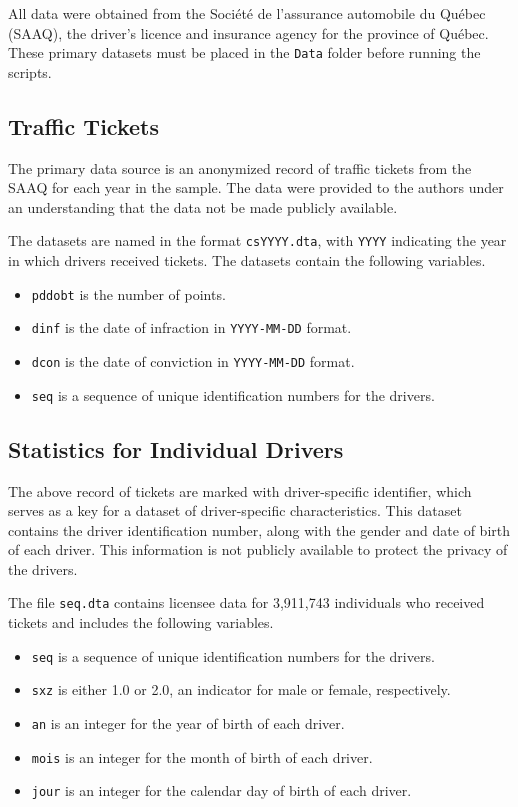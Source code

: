 \documentclass[11pt]{paper}
\begin{document}
All data were obtained from the 
Société de l'assurance automobile du Qu\'{e}bec (SAAQ), 
the driver's licence and insurance agency 
for the province of Qu\'{e}bec. 
These primary datasets must be placed in the \texttt{Data}
folder before running the scripts.


\subsection*{Traffic Tickets}

The primary data source is an anonymized record of traffic tickets from the SAAQ for each year in the sample. 
The data were provided to the authors under an understanding
that the data not be made publicly available. 

The datasets are named in the format \texttt{csYYYY.dta}, 
with \texttt{YYYY} indicating the year in which drivers received tickets. 
The datasets contain the following variables.

\begin{itemize}

\item \texttt{pddobt} is the number of points.
\item \texttt{dinf} is the date of infraction in \texttt{YYYY-MM-DD} format.
\item \texttt{dcon} is the date of conviction in \texttt{YYYY-MM-DD} format.
\item \texttt{seq} is a sequence of unique identification numbers for the drivers.

\end{itemize}


\subsection*{Statistics for Individual Drivers}

The above record of tickets are marked with
driver-specific identifier, which serves as a key for 
a dataset of driver-specific characteristics.
This dataset contains the driver identification number, 
along with the gender and date of birth of each driver.
This information is not publicly available
to protect the privacy of the drivers.

The file \texttt{seq.dta} contains licensee data 
for 3,911,743 individuals who received tickets
and includes the following variables.

\begin{itemize}

\item \texttt{seq} is a sequence of unique identification numbers for the drivers.
\item \texttt{sxz} is either 1.0 or 2.0, an indicator for male or female, respectively.
\item \texttt{an} is an integer for the year of birth of each driver.
\item \texttt{mois} is an integer for the month of birth of each driver.
\item \texttt{jour} is an integer for the calendar day of birth of each driver.

\end{itemize}
\end{document}
